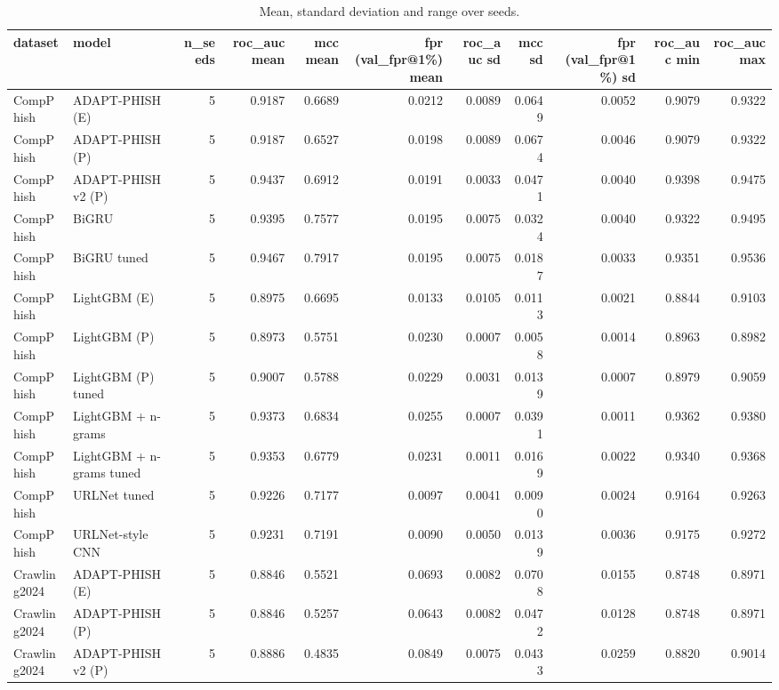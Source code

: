 \begin{table}[t]
\centering
\scriptsize
\caption{Mean, standard deviation and range over seeds.}
\label{tab:rev_R11_seed_summary}
\begin{tabular}{llrrrrrrrrr}
\toprule
dataset & model & n\_seeds & roc\_auc mean & mcc mean & fpr (val\_fpr@1\%) mean & roc\_auc sd & mcc sd & fpr (val\_fpr@1\%) sd & roc\_auc min & roc\_auc max \\
\midrule
CompPhish & ADAPT-PHISH (E) & 5 & 0.9187 & 0.6689 & 0.0212 & 0.0089 & 0.0649 & 0.0052 & 0.9079 & 0.9322 \\
CompPhish & ADAPT-PHISH (P) & 5 & 0.9187 & 0.6527 & 0.0198 & 0.0089 & 0.0674 & 0.0046 & 0.9079 & 0.9322 \\
CompPhish & ADAPT-PHISH v2 (P) & 5 & 0.9437 & 0.6912 & 0.0191 & 0.0033 & 0.0471 & 0.0040 & 0.9398 & 0.9475 \\
CompPhish & BiGRU & 5 & 0.9395 & 0.7577 & 0.0195 & 0.0075 & 0.0324 & 0.0040 & 0.9322 & 0.9495 \\
CompPhish & BiGRU tuned & 5 & 0.9467 & 0.7917 & 0.0195 & 0.0075 & 0.0187 & 0.0033 & 0.9351 & 0.9536 \\
CompPhish & LightGBM (E) & 5 & 0.8975 & 0.6695 & 0.0133 & 0.0105 & 0.0113 & 0.0021 & 0.8844 & 0.9103 \\
CompPhish & LightGBM (P) & 5 & 0.8973 & 0.5751 & 0.0230 & 0.0007 & 0.0058 & 0.0014 & 0.8963 & 0.8982 \\
CompPhish & LightGBM (P) tuned & 5 & 0.9007 & 0.5788 & 0.0229 & 0.0031 & 0.0139 & 0.0007 & 0.8979 & 0.9059 \\
CompPhish & LightGBM + n-grams & 5 & 0.9373 & 0.6834 & 0.0255 & 0.0007 & 0.0391 & 0.0011 & 0.9362 & 0.9380 \\
CompPhish & LightGBM + n-grams tuned & 5 & 0.9353 & 0.6779 & 0.0231 & 0.0011 & 0.0169 & 0.0022 & 0.9340 & 0.9368 \\
CompPhish & URLNet tuned & 5 & 0.9226 & 0.7177 & 0.0097 & 0.0041 & 0.0090 & 0.0024 & 0.9164 & 0.9263 \\
CompPhish & URLNet-style CNN & 5 & 0.9231 & 0.7191 & 0.0090 & 0.0050 & 0.0139 & 0.0036 & 0.9175 & 0.9272 \\
Crawling2024 & ADAPT-PHISH (E) & 5 & 0.8846 & 0.5521 & 0.0693 & 0.0082 & 0.0708 & 0.0155 & 0.8748 & 0.8971 \\
Crawling2024 & ADAPT-PHISH (P) & 5 & 0.8846 & 0.5257 & 0.0643 & 0.0082 & 0.0472 & 0.0128 & 0.8748 & 0.8971 \\
Crawling2024 & ADAPT-PHISH v2 (P) & 5 & 0.8886 & 0.4835 & 0.0849 & 0.0075 & 0.0433 & 0.0259 & 0.8820 & 0.9014 \\

\end{tabular}
\end{table}
